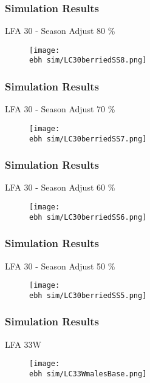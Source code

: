 \documentclass{beamer}
\newcommand{\ebh}{\string~/bio.data/bio.lobster/figures/LFA2733Framework2018/} %
\begin{document}
\begin{frame}
\frametitle{Simulation Results}
LFA 30 - Season Adjust 80 \%
\begin{figure}
        \begin{center}
            \texttt{[image: \\ebh sim/LC30berriedSS8.png]}
        \end{center}
    \end{figure}
\end{frame}


\begin{frame}
\frametitle{Simulation Results}
LFA 30 - Season Adjust 70 \%
\begin{figure}
        \begin{center}
            \texttt{[image: \\ebh sim/LC30berriedSS7.png]}
        \end{center}
    \end{figure}
\end{frame}


\begin{frame}
\frametitle{Simulation Results}
LFA 30 - Season Adjust 60 \%
\begin{figure}
        \begin{center}
            \texttt{[image: \\ebh sim/LC30berriedSS6.png]}
        \end{center}
    \end{figure}
\end{frame}


\begin{frame}
\frametitle{Simulation Results}
LFA 30 - Season Adjust 50 \%
\begin{figure}
        \begin{center}
            \texttt{[image: \\ebh sim/LC30berriedSS5.png]}
        \end{center}
    \end{figure}
\end{frame}



\begin{frame}
\frametitle{Simulation Results}
LFA 33W 
\begin{figure}
        \begin{center}
            \texttt{[image: \\ebh sim/LC33WmalesBase.png]}
        \end{center}
    \end{figure}
\end{frame}
\end{document}
